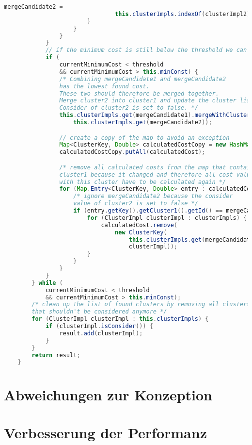 \begin{lstlisting}[language=Java, caption=Hierarchisches Clustering.]
                            mergeCandidate2 =
                                this.clusterImpls.indexOf(clusterImpl2);
                        }
                    }
                }
            }
            // if the minimum cost is still below the threshold we can continue
            if (
                currentMinimumCost < threshold
                && currentMinimumCost > this.minConst) {
                /* Combining mergeCandidate1 and mergeCandidate2
                has the lowest found cost.
                These two should therefore be merged together.
                Merge cluster2 into cluster1 and update the cluster list.
                Consider of cluster2 is set to false. */
                this.clusterImpls.get(mergeCandidate1).mergeWithCluster(
                    this.clusterImpls.get(mergeCandidate2));

                // create a copy of the map to avoid an exception
                Map<ClusterKey, Double> calculatedCostCopy = new HashMap<>();
                calculatedCostCopy.putAll(calculatedCost);

                /* remove all calculated costs from the map that contain
                cluster1 because it changed and therefore all cost values
                with this cluster have to be calculated again */
                for (Map.Entry<ClusterKey, Double> entry : calculatedCostCopy.entrySet()) {
                    /* ignore mergeCandidate2 because the consider
                    value of cluster2 is set to false */
                    if (entry.getKey().getCluster1().getId() == mergeCandidate1) {
                        for (ClusterImpl clusterImpl : clusterImpls) {
                            calculatedCost.remove(
                                new ClusterKey(
                                    this.clusterImpls.get(mergeCandidate1),
                                    clusterImpl));
                        }
                    }
                }
            }
        } while (
            currentMinimumCost < threshold
            && currentMinimumCost > this.minConst);
        /* clean up the list of found clusters by removing all clusters
        that shouldn't be considered anymore */
        for (ClusterImpl clusterImpl : this.clusterImpls) {
            if (clusterImpl.isConsider()) {
                result.add(clusterImpl);
            }
        }
        return result;
    }
\end{lstlisting}

\section{Abweichungen zur Konzeption}
\label{5-AbweichungenKonzeption}

\section{Verbesserung der Performanz}
\label{5-Performanz}
